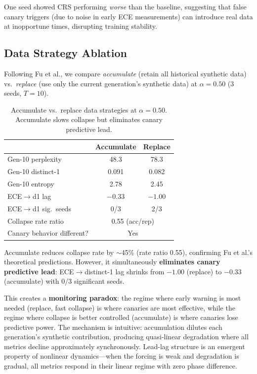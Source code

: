 \documentclass[letterpaper,11pt]{article}
\begin{document}
One seed showed CRS performing \emph{worse} than the baseline, suggesting that false canary triggers (due to noise in early ECE measurements) can introduce real data at inopportune times, disrupting training stability.

\subsection{Data Strategy Ablation}
\label{sec:datastrategy}

Following Fu et al., we compare \emph{accumulate} (retain all historical synthetic data) vs.\ \emph{replace} (use only the current generation's synthetic data) at $\alpha{=}0.50$ (3 seeds, $T{=}10$).

\begin{table}[t]
\centering
\caption{Accumulate vs.\ replace data strategies at $\alpha{=}0.50$. Accumulate slows collapse but eliminates canary predictive lead.}
\label{tab:accreplace}
\small
\begin{tabular}{@{}lcc@{}}
\toprule
& Accumulate & Replace \\
\midrule
Gen-10 perplexity & 48.3 & 78.3 \\
Gen-10 distinct-1 & 0.091 & 0.082 \\
Gen-10 entropy & 2.78 & 2.45 \\
\midrule
ECE$\to$d1 lag & $-0.33$ & $-1.00$ \\
ECE$\to$d1 sig.\ seeds & 0/3 & 2/3 \\
Collapse rate ratio & \multicolumn{2}{c}{0.55 (acc/rep)} \\
Canary behavior different? & \multicolumn{2}{c}{Yes} \\
\bottomrule
\end{tabular}
\end{table}

Accumulate reduces collapse rate by $\sim$45\% (rate ratio 0.55), confirming Fu et al.'s theoretical predictions.
However, it simultaneously \textbf{eliminates canary predictive lead}: ECE$\to$distinct-1 lag shrinks from $-1.00$ (replace) to $-0.33$ (accumulate) with 0/3 significant seeds.

This creates a \textbf{monitoring paradox}: the regime where early warning is most needed (replace, fast collapse) is where canaries are most effective, while the regime where collapse is better controlled (accumulate) is where canaries lose predictive power.
The mechanism is intuitive: accumulation dilutes each generation's synthetic contribution, producing quasi-linear degradation where all metrics decline approximately synchronously.
Lead-lag structure is an emergent property of nonlinear dynamics---when the forcing is weak and degradation is gradual, all metrics respond in their linear regime with zero phase difference.
\end{document}
